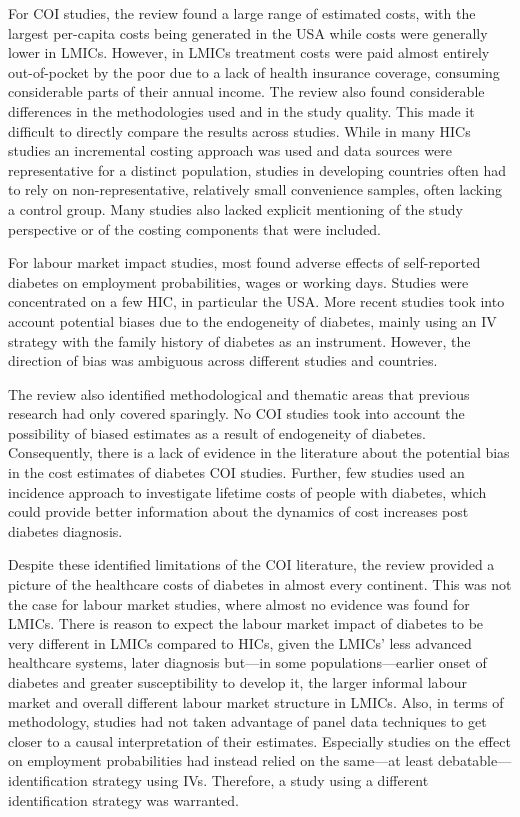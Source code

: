 For \ac{COI} studies, the review found a large range of estimated costs, with the largest per-capita costs being generated in the USA while costs were generally lower in \acp{LMIC}. However, in \acp{LMIC} treatment costs were paid almost entirely out-of-pocket by the poor due to a lack of health insurance coverage, consuming considerable parts of their annual income.  The review also found considerable differences in the methodologies used and in the study quality. This made it difficult to directly compare the results across studies. While in many \acp{HIC} studies an incremental costing approach was used and data sources were representative for a distinct population, studies in developing countries often had to rely on non-representative, relatively small convenience samples, often lacking a control group. Many studies also lacked explicit mentioning of the study perspective or of the costing components that were included. 

For labour market impact studies, most found adverse effects of self-reported diabetes on employment probabilities, wages or working days. Studies were concentrated on a few \ac{HIC}, in particular the USA. More recent studies took into account potential biases due to the endogeneity of diabetes, mainly using an \ac{IV} strategy with the family history of diabetes as an instrument. However, the direction of bias was ambiguous across different studies and countries. 

The review also identified methodological and thematic areas that previous research had only covered sparingly. No \ac{COI} studies took into account the possibility of biased estimates as a result of endogeneity of diabetes. Consequently, there is a lack of evidence in the literature about the potential bias in the cost estimates of diabetes \ac{COI} studies. Further, few studies used an incidence approach to investigate lifetime costs of people with diabetes, which could provide better information about the dynamics of cost increases post diabetes diagnosis. 

Despite these identified limitations of the \ac{COI} literature, the review provided a picture of the healthcare costs of diabetes in almost every continent. This was not the case for labour market studies, where almost no evidence was found for \acp{LMIC}. There is reason to expect the labour market impact of diabetes to be very different in \acp{LMIC} compared to \acp{HIC}, given the \acp{LMIC}' less advanced healthcare systems, later diagnosis but---in some populations---earlier onset of diabetes and greater susceptibility to develop it, the larger informal labour market and overall different labour market structure in \acp{LMIC}. Also, in terms of methodology, studies had not taken advantage of panel data techniques to get closer to a causal interpretation of their estimates. Especially studies on the effect on employment probabilities had instead relied on the same---at least debatable---identification strategy using \acp{IV}. Therefore, a study using a different identification strategy was warranted.

